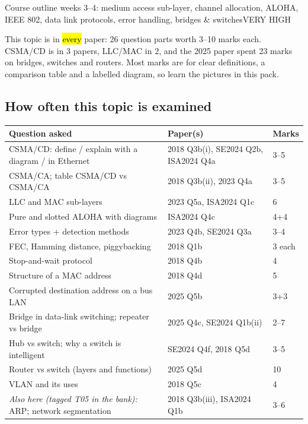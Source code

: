\documentclass[10pt]{article}
\begin{document}
  {Course outline weeks 3--4: medium access sub-layer, channel allocation, ALOHA, IEEE 802, data link protocols, error handling, bridges \& switches}{VERY HIGH}

This topic is in \hl{every} paper: 26 question parts worth 3--10 marks each. CSMA/CD is in 3 papers, LLC/MAC in 2, and the 2025 paper spent 23 marks on bridges, switches and routers.
Most marks are for clear definitions, a comparison table and a labelled diagram, so learn the pictures in this pack.

\subsection*{How often this topic is examined}
\begin{tabularx}{\linewidth}{@{}Xll@{}}
\toprule
\textbf{Question asked} & \textbf{Paper(s)} & \textbf{Marks}\\
\midrule
CSMA/CD: define / explain with a diagram / in Ethernet & 2018 Q3b(i), SE2024 Q2b, ISA2024 Q4a & 3--5\\
CSMA/CA; table CSMA/CD vs CSMA/CA & 2018 Q3b(ii), 2023 Q4a & 3--5\\
LLC and MAC sub-layers & 2023 Q5a, ISA2024 Q1c & 6\\
Pure and slotted ALOHA with diagrams & ISA2024 Q4c & 4+4\\
Error types + detection methods & 2023 Q4b, SE2024 Q3a & 3--4\\
FEC, Hamming distance, piggybacking & 2018 Q1b & 3 each\\
Stop-and-wait protocol & 2018 Q4b & 4\\
Structure of a MAC address & 2018 Q4d & 5\\
Corrupted destination address on a bus LAN & 2025 Q5b & 3+3\\
Bridge in data-link switching; repeater vs bridge & 2025 Q4c, SE2024 Q1b(ii) & 2--7\\
Hub vs switch; why a switch is intelligent & SE2024 Q4f, 2018 Q5d & 3--5\\
Router vs switch (layers and functions) & 2025 Q5d & 10\\
VLAN and its uses & 2018 Q5c & 4\\
\textit{Also here (tagged T05 in the bank):} ARP; network segmentation & 2018 Q3b(iii), ISA2024 Q1b & 3--6\\
\bottomrule
\end{tabularx}
\end{document}
